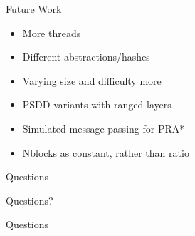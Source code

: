 \documentclass[style=unh]{powerdot}
\begin{document}

\begin{slide}{Future Work}
  \begin{itemize}
  \item More threads
  \item Different abstractions/hashes
  \item Varying size and difficulty more
  \item PSDD variants with ranged layers
  \item Simulated message passing for PRA*
  \item Nblocks as constant, rather than ratio
  \end{itemize}
\end{slide}


\begin{slide}{Questions}
  \begin{center}
    Questions?
  \end{center}
\end{slide}{Questions}

\end{document}
